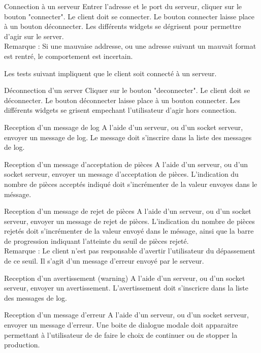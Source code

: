     {Connection à un serveur}
    {Entrer l'adresse et le port du serveur, cliquer sur le bouton "connecter".}
    {Le client doit se connecter.
    Le bouton connecter laisse place à un bouton déconnecter.
    Les différents widgets se dégrisent pour permettre d'agir sur le server.\\
    Remarque : Si une mauvaise addresse, ou une adresse suivant un mauvait format est rentré, le comportement est incertain.}

Les tests suivant impliquent que le client soit connecté à un serveur.

    {Déconnection d'un server}
    {Cliquer sur le bouton "deconnecter".}
    {Le client doit se déconnecter.
    Le bouton déconnecter laisse place à un bouton connecter.
    Les différents widgets se grisent empechant l'utilisateur d'agir hors connection.}

{Reception d'un message de log}
    {A l'aide d'un serveur, ou d'un socket serveur, envoyer un message de log.}
    {Le message doit s'inscrire dans la liste des messages de log.}

{Reception d'un message d'acceptation de pièces}
    {A l'aide d'un serveur, ou d'un socket serveur, envoyer un message d'acceptation de pièces.}
    {L'indication du nombre de pièces acceptés indiqué doit s'incrémenter de la valeur envoyes dans le méssage.}

{Reception d'un message de rejet de pièces}
    {A l'aide d'un serveur, ou d'un socket serveur, envoyer un message de rejet de pièces.}
    {L'indication du nombre de pièces rejetés doit s'incrémenter de la valeur envoyé dans le méssage, ainsi que la barre de progression indiquant l'atteinte du seuil de pièces rejeté.\\
    Remarque : Le client n'est pas responsable d'avertir l'utilisateur du dépassement de ce seuil. Il s'agit d'un message d'erreur envoyé par le serveur.}

{Reception d'un avertissement (warning)}
    {A l'aide d'un serveur, ou d'un socket serveur, envoyer un avertissement.}
    {L'avertissement doit s'inscricre dans la liste des messages de log.}

{Reception d'un message d'erreur}
	{A l'aide d'un serveur, ou d'un socket serveur, envoyer un message d'erreur.}
	{Une boite de dialogue modale doit apparaitre permettant à l'utilisateur de de faire le choix de continuer ou de stopper la production.}

